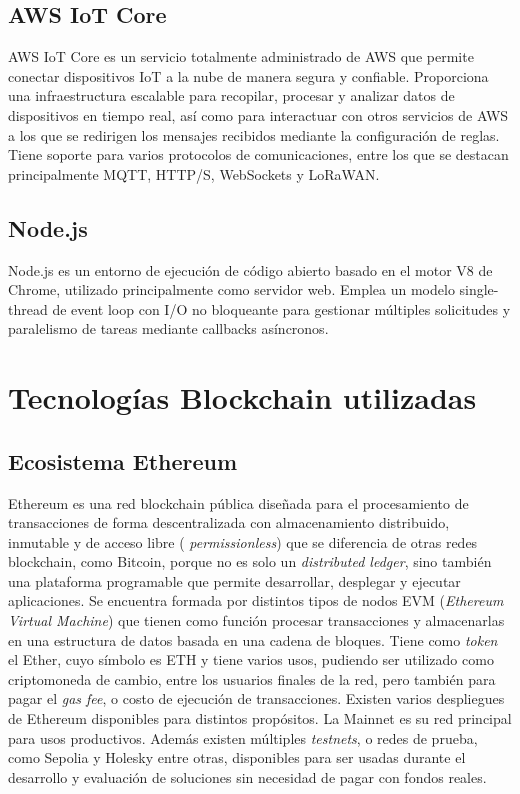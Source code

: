 \subsection{AWS IoT Core}

AWS IoT Core \citep{aws_iot_core} es un servicio totalmente administrado de AWS que permite conectar dispositivos IoT a la nube de manera segura y confiable. Proporciona una infraestructura escalable para recopilar, procesar y analizar datos de dispositivos en tiempo real, así como para interactuar con otros servicios de AWS a los que se redirigen los mensajes recibidos mediante la configuración de reglas. Tiene soporte para varios protocolos de comunicaciones, entre los que se destacan principalmente MQTT, HTTP/S, WebSockets y LoRaWAN.

\subsection{Node.js}

Node.js \citep{nodejs} es un entorno de ejecución de código abierto basado en el motor V8 de Chrome, utilizado principalmente como servidor web. Emplea un modelo single-thread de event loop con I/O no bloqueante para gestionar múltiples solicitudes y paralelismo de tareas mediante callbacks asíncronos.


\section{Tecnologías Blockchain utilizadas}


\subsection{Ecosistema Ethereum}

Ethereum \citep{ethereum} es una red blockchain pública diseñada para el procesamiento de transacciones de forma descentralizada con almacenamiento distribuido, inmutable y de acceso libre ( \textit{permissionless}) que se diferencia de otras redes blockchain, como Bitcoin, porque no es solo un \textit{distributed ledger}, sino también una plataforma programable que permite desarrollar, desplegar y ejecutar aplicaciones. Se encuentra formada por distintos tipos de nodos EVM (\textit{Ethereum Virtual Machine}) \citep{evm} que tienen como función procesar transacciones y almacenarlas en una estructura de datos basada en una cadena de bloques. Tiene como \textit{token} el Ether, cuyo símbolo es ETH y tiene varios usos, pudiendo ser utilizado como criptomoneda de cambio, entre los usuarios finales de la red, pero también para pagar el \textit{gas fee}, o costo de ejecución de transacciones. 
Existen varios despliegues de Ethereum disponibles para distintos propósitos. La Mainnet \citep{mainnet} es su red principal para usos productivos. Además existen múltiples \textit{testnets}, o redes de prueba, como Sepolia \citep{sepolia} y Holesky \citep{holesky} entre otras, disponibles para ser usadas durante el desarrollo y evaluación de soluciones sin necesidad de pagar con fondos reales. 


